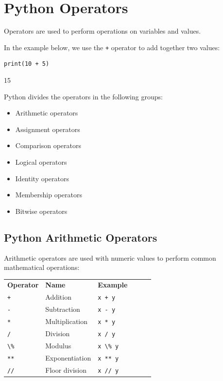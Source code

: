 \documentclass[12pt,a4paper]{article}
\newcommand{\code}[1]{%
	\colorbox{backcolour}{\lstinline{#1}}%
}
\newcommand{\lcode}[1]{%
	\lstinline{#1}%
}
\newcommand{\trcol}[3]{%
	#1 \quad  & #2 & #3 \\
}
\begin{document}
\section{Python Operators}

Operators are used to perform operations on variables and values.

In the example below, we use the \code{+} operator to add together two values:

\begin{ebox}
	\begin{lstlisting}
print(10 + 5)
	\end{lstlisting}
\tcblower
	\begin{vercode}
15
	\end{vercode}
\end{ebox}

Python divides the operators in the following groups:

\begin{itemize}
	\item Arithmetic operators
	\item Assignment operators
	\item Comparison operators
	\item Logical operators
	\item Identity operators
	\item Membership operators
	\item Bitwise operators
\end{itemize}

\subsection{Python Arithmetic Operators}

Arithmetic operators are used with numeric values to perform common mathematical operations:

\begin{table}[h]
	\begin{center}
	\begin{tabularx}{.5\textwidth}{XlXlrX}
		\trcol{{\bfseries Operator}}{{\bfseries Name}}{{\bfseries Example}}
		\trcol{\lcode{+}}{Addition}{\lcode{x + y}}
		\trcol{\lcode{-}}{Subtraction}{\lcode{x - y}}
		\trcol{\lcode{*}}{Multiplication}{\lcode{x * y}}
		\trcol{\lcode{/}}{Division}{\lcode{x / y}}
		\trcol{\lcode{\%}}{Modulus}{\lcode{x \% y}}
		\trcol{\lcode{**}}{Exponentiation}{\lcode{x ** y}}
		\trcol{\lcode{//}}{Floor division}{\lcode{x // y}}
	\end{tabularx}
	\end{center}
\end{table}
\end{document}
